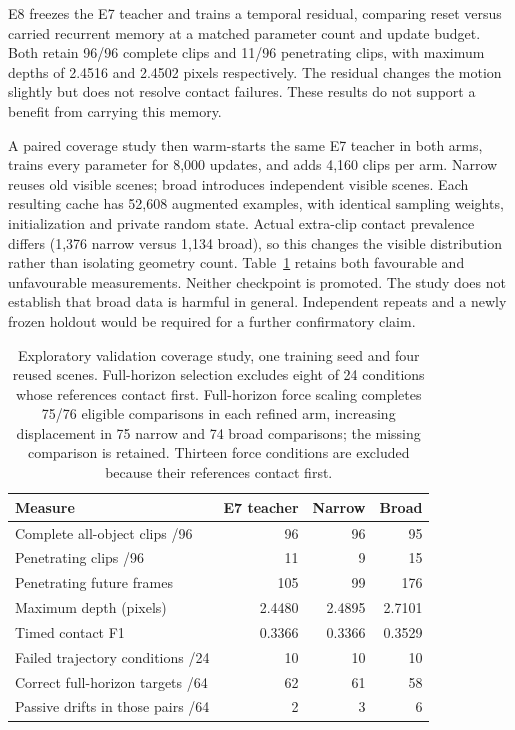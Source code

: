 \documentclass[11pt,a4paper]{article}
\begin{document}
E8 freezes the E7 teacher and trains a temporal residual, comparing reset versus carried recurrent memory at a matched parameter count and update budget. Both retain 96/96 complete clips and 11/96 penetrating clips, with maximum depths of 2.4516 and 2.4502 pixels respectively. The residual changes the motion slightly but does not resolve contact failures. These results do not support a benefit from carrying this memory.

A paired coverage study then warm-starts the same E7 teacher in both arms, trains every parameter for 8,000 updates, and adds 4,160 clips per arm. Narrow reuses old visible scenes; broad introduces independent visible scenes. Each resulting cache has 52,608 augmented examples, with identical sampling weights, initialization and private random state. Actual extra-clip contact prevalence differs (1,376 narrow versus 1,134 broad), so this changes the visible distribution rather than isolating geometry count. Table~\ref{tab:coverage} retains both favourable and unfavourable measurements. Neither checkpoint is promoted. The study does not establish that broad data is harmful in general. Independent repeats and a newly frozen holdout would be required for a further confirmatory claim.

\begin{table}[!ht]
\centering
\small
\begin{tabular}{lrrr}
\hline
Measure & E7 teacher & Narrow & Broad \\
\hline
Complete all-object clips /96 & 96 & 96 & 95 \\
Penetrating clips /96 & 11 & 9 & 15 \\
Penetrating future frames & 105 & 99 & 176 \\
Maximum depth (pixels) & 2.4480 & 2.4895 & 2.7101 \\
Timed contact F1 & 0.3366 & 0.3366 & 0.3529 \\
Failed trajectory conditions /24 & 10 & 10 & 10 \\
Correct full-horizon targets /64 & 62 & 61 & 58 \\
Passive drifts in those pairs /64 & 2 & 3 & 6 \\
\hline
\end{tabular}
\caption{Exploratory validation coverage study, one training seed and four reused scenes. Full-horizon selection excludes eight of 24 conditions whose references contact first. Full-horizon force scaling completes 75/76 eligible comparisons in each refined arm, increasing displacement in 75 narrow and 74 broad comparisons; the missing comparison is retained. Thirteen force conditions are excluded because their references contact first.}
\label{tab:coverage}
\end{table}
\end{document}
